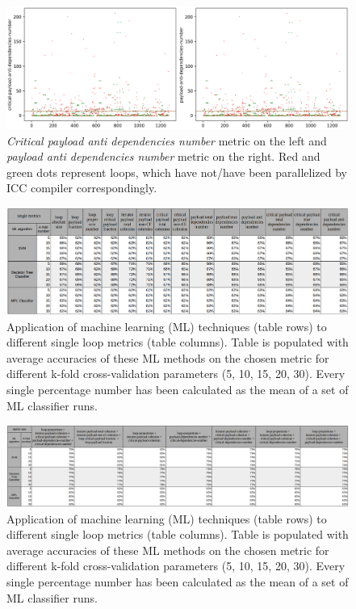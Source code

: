 \begin{figure}[h]
	\centering
	\includegraphics[width=\linewidth]{figs/loop-dependencies-number-2.png}
	\caption{\textit{Critical payload anti dependencies number} metric on the left and \textit{payload anti dependencies number} metric on the right. Red and green dots represent loops, which have not/have been parallelized by ICC compiler correspondingly.}
	\label{loop-dependencies-number-2}
\end{figure}

\begin{figure}[htb]
	\centering
	\includegraphics[width=\linewidth]{figs/single-metric-ml-table-1.png}
	\caption{Application of machine learning (ML) techniques (table rows) to different single loop metrics (table columns). Table is populated with average accuracies of these ML methods on the chosen metric for different k-fold cross-validation parameters (5, 10, 15, 20, 30). Every single percentage number has been calculated as the mean of a set of ML classifier runs. }
	\label{single-metric-ml-table-1}
\end{figure}

\begin{figure}[htb]
\centering
\includegraphics[width=\linewidth]{figs/metric-set-ml-table-1.png}
\caption{Application of machine learning (ML) techniques (table rows) to different single loop metrics (table columns). Table is populated with average accuracies of these ML methods on the chosen metric for different k-fold cross-validation parameters (5, 10, 15, 20, 30). Every single percentage number has been calculated as the mean of a set of ML classifier runs. }
\label{metric-set-ml-table-1}
\end{figure}

